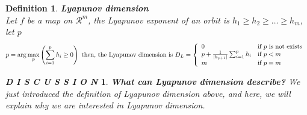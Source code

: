 \documentclass[12pt]{article}
\theoremstyle{plain}
\newtheorem{definition}{{\color{red}\textbf{Definition}}}[section]
\newtheorem{discussion}{\textit{D I S C U S S I O N}}[section]
\begin{document}
\begin{definition}\textbf{Lyapunov dimension}
\\\noindent Let $f$ be a map on $\mathcal R^m$, the Lyapunov exponent of an orbit is $h_1 \geq h_2 \geq \ldots \geq h_m$, let $p$
$$
p = \arg\max_{p} \left(\sum_{i = 1}^{p} h_i \geq 0\right) \text{ then, the Lyapunov dimension is } D_L = 
\left\{\begin{array}{ll}
0                                           & \text{if $p$ is not exists }\\
p + {1\over |h_{p+1}|} \sum_{i = 1}^{p} h_i & \text{if $p < m$}\\
m                                           & \text{if $p = m$}\\
\end{array}\right.
$$
\end{definition}
\begin{discussion}\textbf{What can Lyapunov dimension describe?}
We just introduced the definition of Lyapunov dimension above, and here, we will explain why we are interested in Lyapunov dimension.
\end{discussion}






\end{document}
